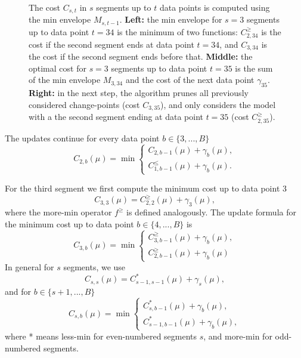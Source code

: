 \documentclass{article}
\begin{document}
\begin{figure}[!t]
  \begin{center}
    
  \end{center}
  \caption{\label{fig:min-envelope} The cost $C_{s,t}$ in $s$ segments
    up to $t$ data points is computed using the min envelope
    $M_{s,t-1}$. \textbf{Left:} the min envelope for $s=3$ segments up
    to data point $t=34$ is the minimum of two functions:
    $C^{\geq}_{2,34}$ is the cost if the second segment ends at data
    point $t=34$, and $C_{3,34}$ is the cost if the second segment
    ends before that. \textbf{Middle:} the optimal cost for $s=3$
    segments up to data point $t=35$ is the sum of the min envelope
    $M_{3,34}$ and the cost of the next data point
    $\gamma_{35}$. \textbf{Right:} in the next step, the
    algorithm prunes all previously considered change-points (cost
    $C_{3,35}$), and only considers the model with a the second segment
    ending at data point $t=35$ (cost $C^{\geq}_{2,35}$).}
\end{figure}

The updates continue for every data point $b\in\{3, ..., B\}$
\begin{equation*}
  C_{2,b}(\mu) = \min
  \begin{cases}
    C_{2,b-1}(\mu) + \gamma_b(\mu),\\
    C_{1,b-1}^{\leq}(\mu) + \gamma_b(\mu).
  \end{cases}
\end{equation*}

For the third segment we first compute the minimum cost up to data point 3
\begin{equation*}
  C_{3,3}(\mu) = C_{2,2}^{\geq}(\mu) + \gamma_3(\mu),
\end{equation*}
where the more-min operator $f^\geq$ is defined analogously. The
update formula for the minimum cost up to data point
$b\in\{4, ..., B\}$ is
\begin{equation*}
  C_{3,b}(\mu) = \min
  \begin{cases}
    C_{3,b-1}^{\geq}(\mu)+\gamma_b(\mu),\\
    C_{2,b-1}^{\geq}(\mu)+\gamma_b(\mu)
  \end{cases}
\end{equation*}
In general for $s$ segments, we use
\begin{equation}
  C_{s,s}(\mu) = C_{s-1,s-1}^{*}(\mu) + \gamma_s(\mu),
\end{equation}
and for $b\in\{s+1, ..., B\}$
\begin{equation}
  C_{s,b}(\mu) = \min
  \begin{cases}
    C_{s,b-1}^{*}(\mu)+\gamma_b(\mu),\\
    C_{s-1,b-1}^{*}(\mu)+\gamma_b(\mu),
  \end{cases}
\end{equation}
where * means less-min for even-numbered segments $s$, and more-min
for odd-numbered segments.
\end{document}
